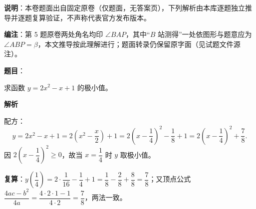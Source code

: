 

\begin{gktip}
\textbf{说明}：本卷题面出自固定原卷（仅题面，无答案页），下列解析由本库逐题独立推导并逐题复算验证，不声称代表官方发布版本。

\textbf{编注}：第 5 题原卷两处角名均印 $\angle BAP$，其中“$B$ 站测得”一处依图形与题意应为 $\angle ABP=\beta$，本文推导按此理解进行；题面转录仍保留原字面（见试题文件源注）。
\end{gktip}

\begin{answer}

\textbf{题目}：

求函数 $y=2x^2-x+1$ 的极小值。

\textbf{解析}

配方：
\nopagebreak[4]
\[
y=2x^2-x+1=2\left(x^2-\frac x2\right)+1=2\left(x-\frac14\right)^2-\frac18+1=2\left(x-\frac14\right)^2+\frac78.
\]
因 $2\left(x-\dfrac14\right)^2\ge0$，故当 $x=\dfrac14$ 时 $y$ 取极小值。

\textbf{复算}：$y\left(\dfrac14\right)=2\cdot\dfrac1{16}-\dfrac14+1=\dfrac18-\dfrac28+\dfrac88=\dfrac78$；又顶点公式 $\dfrac{4ac-b^2}{4a}=\dfrac{4\cdot2\cdot1-1}{4\cdot2}=\dfrac78$，两法一致。


\end{answer}
